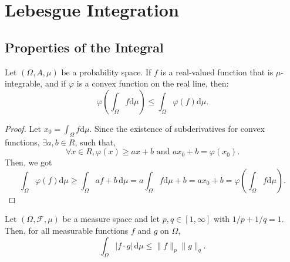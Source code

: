 \chapter{Lebesgue Integration}

\section{Properties of the Integral}

\begin{theorem}
	Let $(\Omega,A,\mu)$ be a probability space. If $f$ is a real-valued function that is $\mu$-integrable, and if $\varphi$ is a convex function on the real line, then:
	\begin{equation}
		\varphi\left(\int_{\Omega}f\mathrm{d}\mu\right)\leq\int_{\Omega}\varphi(f)\mathrm{d}\mu.
	\end{equation}
\end{theorem}

\begin{proof}
	Let $x_{0}=\int_{\Omega}f\mathrm{d}\mu$. Since the existence of subderivatives for convex functions, $\exists a,b\in R$, such that,
	\begin{equation*}
		\forall x\in R,\varphi(x)\geq ax+b\text{ and }ax_0+b=\varphi(x_0).
	\end{equation*}
	Then, we got
	\begin{equation*}
		\int_{\Omega}\varphi(f)\mathrm{d}\mu\geq\int_{\Omega}af+b\,\mathrm{d}\mu=a\int_{\Omega}f\mathrm{d}\mu+b=ax_0+b=\varphi\left(\int_{\Omega}f\mathrm{d}\mu\right).
	\end{equation*}
\end{proof}

\begin{theorem} \label{thm:holder-inequality}
	Let $(\Omega,\mathcal{F},\mu)$ be a measure space and let $p,q\in[1,\infty]$ with $1/p+1/q=1$. Then, for all measurable functions $f$ and $g$ on $\Omega$,
	\begin{equation}
		\int_{\Omega}|f\cdot g|\,\mathrm{d}\mu\leq\|f\|_{p}\|g\|_{q}.
	\end{equation}
\end{theorem}


